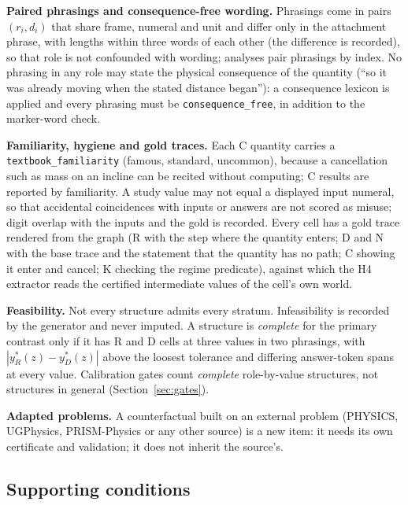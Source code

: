 \documentclass[10pt,a4paper]{article}
\begin{document}
\textbf{Paired phrasings and consequence-free wording.} Phrasings come in pairs $(r_i,d_i)$ that share frame, numeral and
unit and differ only in the attachment phrase, with lengths within three words of each other (the difference is
recorded), so that role is not confounded with wording; analyses pair phrasings by index. No phrasing in any role may state
the physical consequence of the quantity (``so it was already moving when the stated distance began''): a consequence
lexicon is applied and every phrasing must be \texttt{consequence\_free}, in addition to the marker-word check.

\textbf{Familiarity, hygiene and gold traces.} Each C quantity carries a \texttt{textbook\_familiarity} (famous, standard,
uncommon), because a cancellation such as mass on an incline can be recited without computing; C results are reported by
familiarity. A study value may not equal a displayed input numeral, so that accidental coincidences with inputs or answers
are not scored as misuse; digit overlap with the inputs and the gold is recorded. Every cell has a gold trace rendered from
the graph (R with the step where the quantity enters; D and N with the base trace and the statement that the quantity has no
path; C showing it enter and cancel; K checking the regime predicate), against which the H4 extractor reads the certified
intermediate values of the cell's own world.

\textbf{Feasibility.} Not every structure admits every stratum. Infeasibility is recorded by the generator and
never imputed. A structure is \emph{complete} for the primary contrast only if it has R and D cells at three values
in two phrasings, with $|y^*_R(z)-y^*_D(z)|$ above the loosest tolerance and differing answer-token spans at every
value. Calibration gates count \emph{complete} role-by-value structures, not structures in
general (Section~\ref{sec:gates}).

\textbf{Adapted problems.} A counterfactual built on an external problem (PHYSICS, UGPhysics, PRISM-Physics or any
other source) is a new item: it needs its own certificate and validation; it does not inherit the source's.

\subsection{Supporting conditions}
\label{sec:conditions}
\end{document}
